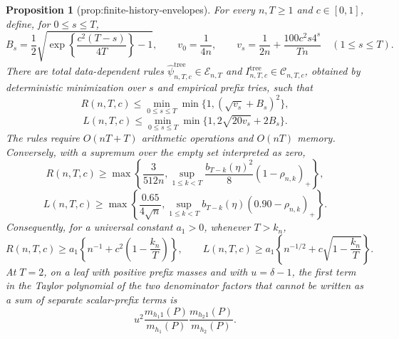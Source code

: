 \documentclass{article}
\newtheorem{proposition}{Proposition}
\begin{document}
\begin{proposition}[prop:finite-history-envelopes]\label{prop:finite-history-envelopes}
For every \(n,T\geq1\) and \(c\in[0,1]\), define, for \(0\leq s\leq T\),
\[
B_s=\frac12\sqrt{\exp\!\left\{\frac{c^2(T-s)}{4T}\right\}-1},
\qquad v_0=\frac1{4n},
\qquad v_s=\frac1{2n}+\frac{100c^2s4^s}{Tn}\quad(1\leq s\leq T).
\]
There are total data-dependent rules \(\widehat\psi^{\mathrm{tree}}_{n,T,c}\in\mathcal E_{n,T}\) and \(I^{\mathrm{tree}}_{n,T,c}\in\mathcal C_{n,T,c}\), obtained by deterministic minimization over \(s\) and empirical prefix tries, such that
\[
R(n,T,c)\leq\min_{0\leq s\leq T}\min\{1,(\sqrt{v_s}+B_s)^2\},
\]
\[
L(n,T,c)\leq\min_{0\leq s\leq T}\min\{1,2\sqrt{20v_s}+2B_s\}.
\]
The rules require \(O(nT+T)\) arithmetic operations and \(O(nT)\) memory. Conversely, with a supremum over the empty set interpreted as zero,
\[
R(n,T,c)\geq\max\left\{\frac{3}{512n},
\sup_{1\leq k<T}\frac{b_{T-k}(\eta)^2}{8}(1-\rho_{n,k})_+\right\},
\]
\[
L(n,T,c)\geq\max\left\{\frac{0.65}{4\sqrt n},
\sup_{1\leq k<T}b_{T-k}(\eta)(0.90-\rho_{n,k})_+\right\}.
\]
Consequently, for a universal constant \(a_1>0\), whenever \(T>k_n\),
\[
R(n,T,c)\geq a_1\left\{n^{-1}+c^2\left(1-\frac{k_n}{T}\right)\right\},
\qquad
L(n,T,c)\geq a_1\left\{n^{-1/2}+c\sqrt{1-\frac{k_n}{T}}\right\}.
\]
At \(T=2\), on a leaf with positive prefix masses and with \(u=\delta-1\), the first term in the Taylor polynomial of the two denominator factors that cannot be written as a sum of separate scalar-prefix terms is
\[
u^2\frac{m_{h_1 1}(P)}{m_{h_1}(P)}
\frac{m_{h_2 1}(P)}{m_{h_2}(P)}.
\]
\end{proposition}
\end{document}
